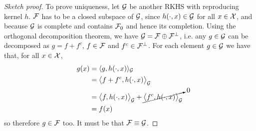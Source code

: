 \begin{proof}[Sketch proof]
  To prove uniqueness, let ${\mathcal G}$ be another RKHS with reproducing kernel $h$.
  ${\mathcal F}$ has to be a closed subspace of ${\mathcal G}$, since $h(\cdot,x) \in {\mathcal G}$ for all $x\in{\mathcal X}$, and because ${\mathcal G}$ is complete and contains ${\mathcal F}_0$ and hence its completion.
  Using the orthogonal decomposition theorem, we have ${\mathcal G} = {\mathcal F} \oplus {\mathcal F}^\bot$, i.e. any $g\in{\mathcal G}$ can be decomposed as $g = f + f^c$, $f\in{\mathcal F}$ and $f^c\in{\mathcal F}^\bot$.
  For each element $g\in{\mathcal G}$ we have that, for all $x\in{\mathcal X}$,
  \begin{align*}
    g(x) &= \langle g,h(\cdot,x)\rangle_{\mathcal G} \\
    &= \big\langle f+f^c, h(\cdot,x) \big\rangle_{\mathcal G} \\
    &= \big\langle f, h(\cdot,x) \big\rangle_{\mathcal G} + \cancelto{0}{\big\langle f^c, h(\cdot,x) \big\rangle_{\mathcal G}} \\
    &= f(x)
  \end{align*}
  so therefore $g\in{\mathcal F}$ too.
  It must be that ${\mathcal F}\equiv{\mathcal G}$.
%  
%  

\end{proof}
